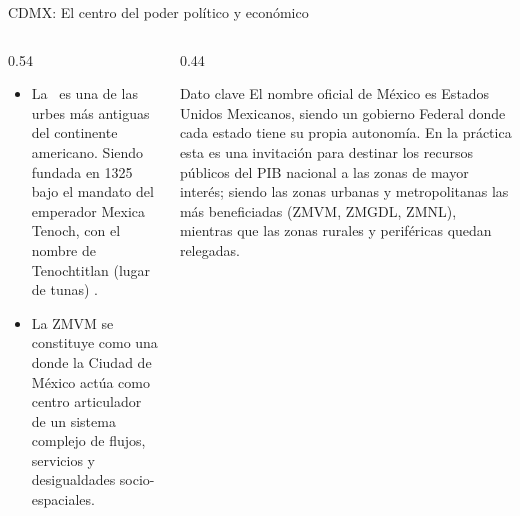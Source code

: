 \begin{frame}{CDMX: El centro del poder político y económico}
  \begin{columns}[T]
    \begin{column}{0.54\textwidth}
      \small
      \begin{itemize}
        \item La \zmvm\ es una de las urbes más antiguas del continente americano. Siendo fundada en 1325
        bajo el mandato del emperador Mexica Tenoch, con el nombre de Tenochtitlan (lugar de tunas) \citep{molina2013erase}.
        \item La ZMVM se constituye como una  donde la Ciudad de México actúa como centro articulador de
              un sistema complejo de flujos, servicios y desigualdades socio-espaciales.
      \end{itemize}
    \end{column}
    \begin{column}{0.44\textwidth}
      \begin{block}{Dato clave}
        \footnotesize
        El nombre oficial de México es Estados Unidos Mexicanos, siendo un gobierno Federal donde cada estado tiene su propia autonomía.
        En la práctica esta es una invitación para destinar los recursos públicos del PIB nacional a las zonas de mayor interés; siendo las
        zonas urbanas y metropolitanas las más beneficiadas (ZMVM, ZMGDL, ZMNL), mientras que las zonas rurales y periféricas quedan relegadas.
      \end{block}
    \end{column}
  \end{columns}
\end{frame}

